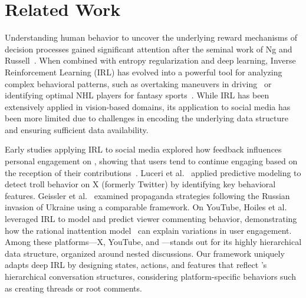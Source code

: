 \section{Related Work}
\label{subsec:related-work}




Understanding human behavior to uncover the underlying reward mechanisms of decision processes gained significant attention after the seminal work of Ng and Russell~\cite{ng2000}. 
When combined with entropy regularization and deep learning, Inverse Reinforcement Learning (IRL) has evolved into a powerful tool for analyzing complex behavioral patterns, such as overtaking maneuvers in driving~\cite{you2019advanced} or identifying optimal NHL players for fantasy sports~\cite{ijcai2020p464}. 
While IRL has been extensively applied in vision-based domains, its application to social media has been more limited due to challenges in encoding the underlying data structure and ensuring sufficient data availability.

Early studies applying IRL to social media explored how feedback influences personal engagement on \reddit, showing that users tend to continue engaging based on the reception of their contributions~\cite{das2014effects}. 
Luceri et al.~\cite{luceri2020detecting} applied predictive modeling to detect troll behavior on X (formerly Twitter) by identifying key behavioral features. Geissler et al.~\cite{geissler2023analyzing} examined propaganda strategies following the Russian invasion of Ukraine using a comparable framework. 
On YouTube, Hoiles et al.~\cite{hoiles2020rationally} leveraged IRL to model and predict viewer commenting behavior, demonstrating how the rational inattention model~\cite{sims2003implications} can explain variations in user engagement. Among these platforms---X, YouTube, and \reddit---\reddit stands out for its highly hierarchical data structure, organized around nested discussions. Our framework uniquely adapts deep IRL by designing states, actions, and features that reflect \reddit's hierarchical conversation structures, considering platform-specific behaviors such as creating threads or root comments.

